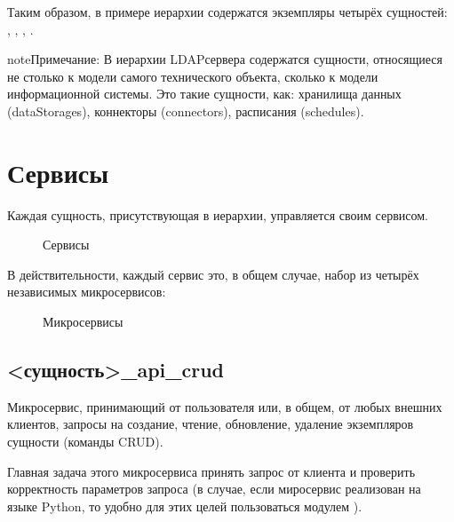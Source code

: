 \documentclass[a4paper,10pt,russian]{sphinxmanual}
\begin{document}
\sphinxAtStartPar
Таким образом, в примере иерархии содержатся экземпляры четырёх сущностей:
, , , .

\begin{sphinxadmonition}{note}{Примечание:}
\sphinxAtStartPar
В иерархии LDAP\sphinxhyphen{}сервера содержатся сущности, относящиеся не столько к модели
самого технического объекта, сколько к модели информационной системы. Это
такие сущности, как: хранилища данных (dataStorages), коннекторы (connectors),
расписания (schedules).
\end{sphinxadmonition}


\section{Сервисы}
\label{\detokenize{architecture:id4}}
\sphinxAtStartPar
Каждая сущность, присутствующая в иерархии, управляется своим сервисом.

\begin{figure}[htbp]
\centering
\capstart

\noindent{}
\caption{Сервисы}\label{\detokenize{architecture:id22}}\end{figure}

\sphinxAtStartPar
В действительности, каждый сервис \sphinxhyphen{} это, в общем случае, набор из четырёх
независимых микросервисов:

\begin{figure}[htbp]
\centering
\capstart

\noindent{}
\caption{Микросервисы}\label{\detokenize{architecture:id23}}\end{figure}


\subsection{\textless{}сущность\textgreater{}\_api\_crud}
\label{\detokenize{architecture:api-crud}}
\sphinxAtStartPar
Микросервис, принимающий от пользователя или, в общем, от любых внешних
клиентов, запросы на создание, чтение, обновление, удаление экземпляров
сущности (команды CRUD).

\sphinxAtStartPar
Главная задача этого микросервиса \sphinxhyphen{} принять запрос от клиента и проверить
корректность параметров запроса (в случае, если миросервис реализован
на языке Python, то удобно для этих целей пользоваться модулем ).
\end{document}
